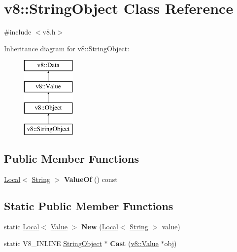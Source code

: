 \hypertarget{classv8_1_1_string_object}{}\section{v8\+:\+:String\+Object Class Reference}
\label{classv8_1_1_string_object}


{\ttfamily \#include $<$v8.\+h$>$}

Inheritance diagram for v8\+:\+:String\+Object\+:\begin{figure}[H]
\begin{center}
\leavevmode
\includegraphics[height=4.000000cm]{classv8_1_1_string_object}
\end{center}
\end{figure}
\subsection*{Public Member Functions}
\begin{DoxyCompactItemize}
\item 
\hyperlink{classv8_1_1_local}{Local}$<$ \hyperlink{classv8_1_1_string}{String} $>$ {\bfseries Value\+Of} () const \hypertarget{classv8_1_1_string_object_a96bd6c736a0272ab7e683038953077e4}{}\label{classv8_1_1_string_object_a96bd6c736a0272ab7e683038953077e4}

\end{DoxyCompactItemize}
\subsection*{Static Public Member Functions}
\begin{DoxyCompactItemize}
\item 
static \hyperlink{classv8_1_1_local}{Local}$<$ \hyperlink{classv8_1_1_value}{Value} $>$ {\bfseries New} (\hyperlink{classv8_1_1_local}{Local}$<$ \hyperlink{classv8_1_1_string}{String} $>$ value)\hypertarget{classv8_1_1_string_object_af343f21a3437b3aab91a7aba5b0a1952}{}\label{classv8_1_1_string_object_af343f21a3437b3aab91a7aba5b0a1952}

\item 
static V8\+\_\+\+I\+N\+L\+I\+NE \hyperlink{classv8_1_1_string_object}{String\+Object} $\ast$ {\bfseries Cast} (\hyperlink{classv8_1_1_value}{v8\+::\+Value} $\ast$obj)\hypertarget{classv8_1_1_string_object_af2169f0b4c890196416e4d28fbf76df8}{}\label{classv8_1_1_string_object_af2169f0b4c890196416e4d28fbf76df8}

\end{DoxyCompactItemize}
